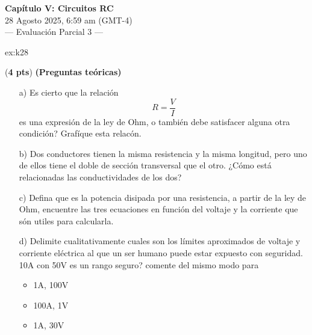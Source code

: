  \begin{multicols}{2}
   \begin{center}
         \LARGE{\textbf{Capítulo V: Circuitos RC}}\\	
         \vspace{0.2cm}
         \large{28 Agosto 2025, 6:59 am (GMT-4)}\\
         \large{— Evaluación Parcial 3 —}
     \end{center}
    \begin{excercise}[][][]{ex:k28}{(\textbf{4 pts})
        \textbf{(Preguntas teóricas)}
        \begin{itemize}
            \item[a)] Es cierto que la relación 
                \begin{equation*}
                    R=\frac{V}{I}
                \end{equation*}
                es una expresión de la ley de Ohm, o también debe satisfacer alguna otra condición? Grafíque esta relacón. 
            \item[b)] Dos conductores tienen la misma resistencia y la misma longitud, pero uno de ellos tiene el doble de sección transversal que el otro. ¿Cómo está relacionadas las conductividades de los dos?
            \item[c)] Defina que es la potencia disipada por una resistencia, a partir de la ley de Ohm, encuentre las tres ecuaciones en función del voltaje y la corriente que són utiles para calcularla.
            \item[d)] Delimite cualitativamente cuales son los límites aproximados de voltaje y corriente eléctrica al que un ser humano puede estar expuesto con seguridad. 10A con 50V es un rango seguro? comente del mismo modo para 
                \begin{itemize}
                    \item 1A, 100V
                    \item 100A, 1V
                    \item 1A, 30V

\end{itemize}
\end{itemize}}
\end{excercise}
\end{multicols}

